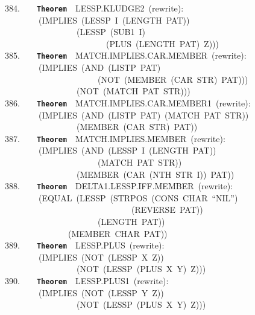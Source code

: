 \documentclass[11pt]{book}
\newenvironment{pubasis}{\begin{flushleft}\ttfamily\small}{\normalsize\rmfamily\end{flushleft}}
\newcommand{\axiomordefinition}[1]{\vspace{6pt}\texttt{\textbf{#1}}}
\begin{document}
\begin{pubasis}
384.~~~~\axiomordefinition{Theorem}~~LESSP.KLUDGE2~(rewrite):\\
~~~~~~~~(IMPLIES~(LESSP~I~(LENGTH~PAT))\\
~~~~~~~~~~~~~~~~~(LESSP~(SUB1~I)\\
~~~~~~~~~~~~~~~~~~~~~~~~(PLUS~(LENGTH~PAT)~Z)))\\

385.~~~~\axiomordefinition{Theorem}~~MATCH.IMPLIES.CAR.MEMBER~(rewrite):\\
~~~~~~~~(IMPLIES~(AND~(LISTP~PAT)\\
~~~~~~~~~~~~~~~~~~~~~~(NOT~(MEMBER~(CAR~STR)~PAT)))\\
~~~~~~~~~~~~~~~~~(NOT~(MATCH~PAT~STR)))\\

386.~~~~\axiomordefinition{Theorem}~~MATCH.IMPLIES.CAR.MEMBER1~(rewrite):\\
~~~~~~~~(IMPLIES~(AND~(LISTP~PAT)~(MATCH~PAT~STR))\\
~~~~~~~~~~~~~~~~~(MEMBER~(CAR~STR)~PAT))\\

387.~~~~\axiomordefinition{Theorem}~~MATCH.IMPLIES.MEMBER~(rewrite):\\
~~~~~~~~(IMPLIES~(AND~(LESSP~I~(LENGTH~PAT))\\
~~~~~~~~~~~~~~~~~~~~~~(MATCH~PAT~STR))\\
~~~~~~~~~~~~~~~~~(MEMBER~(CAR~(NTH~STR~I))~PAT))\\

388.~~~~\axiomordefinition{Theorem}~~DELTA1.LESSP.IFF.MEMBER~(rewrite):\\
~~~~~~~~(EQUAL~(LESSP~(STRPOS~(CONS~CHAR~``NIL'')\\
~~~~~~~~~~~~~~~~~~~~~~~~~~~~~~(REVERSE~PAT))\\
~~~~~~~~~~~~~~~~~~~~~~(LENGTH~PAT))\\
~~~~~~~~~~~~~~~(MEMBER~CHAR~PAT))\\

389.~~~~\axiomordefinition{Theorem}~~LESSP.PLUS~(rewrite):\\
~~~~~~~~(IMPLIES~(NOT~(LESSP~X~Z))\\
~~~~~~~~~~~~~~~~~(NOT~(LESSP~(PLUS~X~Y)~Z)))\\

390.~~~~\axiomordefinition{Theorem}~~LESSP.PLUS1~(rewrite):\\
~~~~~~~~(IMPLIES~(NOT~(LESSP~Y~Z))\\
~~~~~~~~~~~~~~~~~(NOT~(LESSP~(PLUS~X~Y)~Z)))\\


\end{pubasis}
\end{document}
